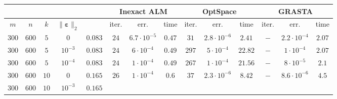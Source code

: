 \documentclass[twocolumn]{svjour3}
\newcommand{\vectornormbig}[1]{\big\|#1\big\|}
\newcommand{\noise}{\boldsymbol{\varepsilon}}
\newcommand{\rank}{k}
\begin{document}
\begin{table*}[!htp]
\begin{center}
\begin{tabular}{|c|c|c|c|c|c|c|c|c|c|c|c|c|c|}
\hline \hline \hline
\multicolumn{4}{c|}{} & & \multicolumn{3}{|c|}{Inexact ALM} & \multicolumn{3}{|c|}{OptSpace} & \multicolumn{3}{|c}{GRASTA} \\
\hline \hline
\multicolumn{1}{c}{$m$} & \multicolumn{1}{c}{$n$} & \multicolumn{1}{c}{$\rank$} & \multicolumn{1}{c|}{$\vectornormbig{\noise}_2$} & & 
\multicolumn{1}{|c}{\rm{iter.}} & \multicolumn{1}{c}{\rm{err.}} & \multicolumn{1}{c|}{\rm{time}} &
\multicolumn{1}{|c}{\rm{iter.}} & \multicolumn{1}{c}{\rm{err.}} & \multicolumn{1}{c|}{\rm{time}} &
\multicolumn{1}{|c}{\rm{iter.}} & \multicolumn{1}{c}{\rm{err.}} & \multicolumn{1}{c}{\rm{time}} \\
\hline\hline
\multicolumn{1}{c}{$300$} & \multicolumn{1}{c}{$600$} & \multicolumn{1}{c}{$5$} & \multicolumn{1}{c|}{$0$} & $0.083$ & 
\multicolumn{1}{|c}{$24$} & \multicolumn{1}{c}{$6.7\cdot 10^{-5}$} & \multicolumn{1}{c|}{$0.47$} &
\multicolumn{1}{|c}{$31$} & \multicolumn{1}{c}{$2.8\cdot 10^{-6}$} & \multicolumn{1}{c|}{$2.41$} &
\multicolumn{1}{|c}{$-$} & \multicolumn{1}{c}{$2.2\cdot 10^{-4}$} & \multicolumn{1}{c}{$2.07$} \\
\hline
\multicolumn{1}{c}{$300$} & \multicolumn{1}{c}{$600$} & \multicolumn{1}{c}{$5$} & \multicolumn{1}{c|}{$10^{-3}$} & $0.083$ & 
\multicolumn{1}{|c}{$24$} & \multicolumn{1}{c}{$6\cdot 10^{-4}$} & \multicolumn{1}{c|}{$0.49$} &
\multicolumn{1}{|c}{$297$} & \multicolumn{1}{c}{$5\cdot 10^{-4}$} & \multicolumn{1}{c|}{$22.82$} &
\multicolumn{1}{|c}{$-$} & \multicolumn{1}{c}{$1\cdot 10^{-4}$} & \multicolumn{1}{c}{$2.07$} \\
\hline
\multicolumn{1}{c}{$300$} & \multicolumn{1}{c}{$600$} & \multicolumn{1}{c}{$5$} & \multicolumn{1}{c|}{$10^{-4}$} & $0.083$ & 
\multicolumn{1}{|c}{$24$} & \multicolumn{1}{c}{$1\cdot 10^{-4}$} & \multicolumn{1}{c|}{$0.49$} &
\multicolumn{1}{|c}{$267$} & \multicolumn{1}{c}{$1\cdot 10^{-4}$} & \multicolumn{1}{c|}{$21.56$} &
\multicolumn{1}{|c}{$-$} & \multicolumn{1}{c}{$8\cdot 10^{-5}$} & \multicolumn{1}{c}{$2.1$} \\
\hline
\multicolumn{1}{c}{$300$} & \multicolumn{1}{c}{$600$} & \multicolumn{1}{c}{$10$} & \multicolumn{1}{c|}{$0$} & $0.165$ & 
\multicolumn{1}{|c}{$26$} & \multicolumn{1}{c}{$1\cdot 10^{-4}$} & \multicolumn{1}{c|}{$0.6$} &
\multicolumn{1}{|c}{$37$} & \multicolumn{1}{c}{$2.3\cdot 10^{-6}$} & \multicolumn{1}{c|}{$8.42$} &
\multicolumn{1}{|c}{$-$} & \multicolumn{1}{c}{$8.6\cdot 10^{-6}$} & \multicolumn{1}{c}{$4.5$} \\
\hline
\multicolumn{1}{c}{$300$} & \multicolumn{1}{c}{$600$} & \multicolumn{1}{c}{$10$} & \multicolumn{1}{c|}{$10^{-3}$} & $0.165$ & 

\end{tabular}
\end{center}
\end{table*}
\end{document}
